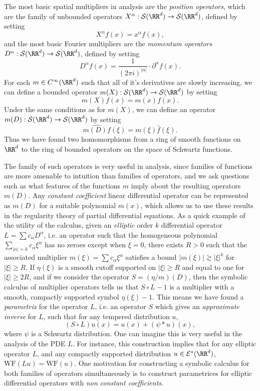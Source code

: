 The most basic spatial multipliers in analysis are the \emph{position operators}, which are the family of unbounded operators $X^\alpha: \mathcal{S}(\RR^d) \to \mathcal{S}(\RR^d)$, defined by setting
%
\[ X^\alpha f(x) = x^\alpha f(x), \]
%
and the most basic Fourier multipliers are the \emph{momentum operators} $D^\alpha: \mathcal{S}(\RR^d) \to \mathcal{S}(\RR^d)$, defined by setting
%
\[ D^\alpha f(x) = \frac{1}{(2\pi i)^{|\alpha|}} \cdot \partial^\alpha f(x). \]
%
For each $m \in C^\infty(\RR^d)$ such that all of it's derivatives are slowly increasing, we can define a bounded operator $m(X): \mathcal{S}(\RR^d) \to \mathcal{S}(\RR^d)$ by setting
%
\[ m(X) f(x) = m(x) f(x). \]
%
Under the same conditions as for $m(X)$, we can define an operator $m(D): \mathcal{S}(\RR^d) \to \mathcal{S}(\RR^d)$ by setting
%
\[ \widehat{m(D) f}(\xi) = m(\xi) \widehat{f}(\xi). \]
%
Thus we have found two homomorphisms from a ring of smooth functions on $\RR^d$ to the ring of bounded operators on the space of Schwartz functions.

The family of such operators is very useful in analysis, since families of functions are more amenable to intuition than families of operators, and we ask questions such as what features of the functions $m$ imply about the resulting operators $m(D)$. Any \emph{constant coefficient} linear differential operator can be represented as $m(D)$ for a suitable polynomial $m(x)$, which allows us to use these results in the regularity theory of partial differential equations. As a quick example of the utility of the calculus, given an \emph{elliptic} order $k$ differential operator $L = \sum c_\alpha D^\alpha$, i.e. an operator such that the homogeneous polynomial $\sum_{|\alpha| = k} c_\alpha \xi^\alpha$ has no zeroes except when $\xi = 0$, there exists $R > 0$ such that the associated multiplier $m(\xi) = \sum c_\alpha \xi^\alpha$ satisfies a bound $|m(\xi)| \gtrsim |\xi|^k$ for $|\xi| \geq R$. If $\eta(\xi)$ is a smooth cutoff supported on $|\xi| \geq R$ and equal to one for $|\xi| \geq 2R$, and if we consider the operator $S = (\eta / m)(D)$, then the symbolic calculus of multiplier operators tells us that $S \circ L - 1$ is a multiplier with a smooth, compactly supported symbol $\eta(\xi) - 1$. This means we have found a \emph{parametrix} for the operator $L$, i.e. an operator $S$ which gives an \emph{approximate inverse} for $L$, such that for any tempered distribution $u$,
%
\[ (S \circ L) u(x) = u(x) + (\psi * u)(x), \]
%
where $\psi$ is a Schwartz distribution. One can imagine this is very useful in the analysis of the PDE $L$. For instance, this construction implies that for any elliptic operator $L$, and any compactly supported distribution $u \in \mathcal{E}^*(\RR^d)$, $\text{WF}(Lu) = \text{WF}(u)$. One motivation for constructing a symbolic calculus for both families of operators simultaneously is to construct parametrices for elliptic differential operators with \emph{non constant coefficients}.

